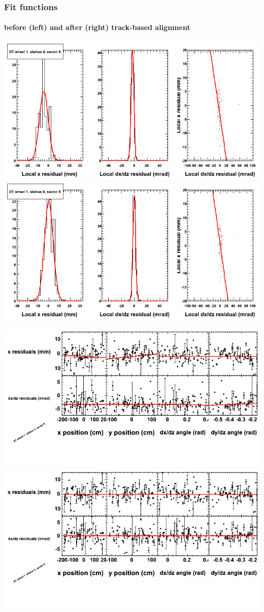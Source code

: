 \documentclass[compress]{beamer}
\begin{document}
\begin{frame}
\frametitle{Fit functions}
\framesubtitle{before (left) and after (right) track-based alignment}
\includegraphics[width=0.5\linewidth]{fitfunctions_re01/MBwhDst4sec08_bellcurves.png} \includegraphics[width=0.5\linewidth]{fitfunctions_re05/MBwhDst4sec08_bellcurves.png}

\includegraphics[width=0.5\linewidth]{fitfunctions_re01/MBwhDst4sec08_polynomials.png} \includegraphics[width=0.5\linewidth]{fitfunctions_re05/MBwhDst4sec08_polynomials.png}
\end{frame}
\end{document}
